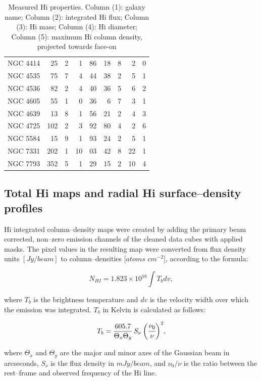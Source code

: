 \documentclass[usenatbib,useAMS]{mnras}
\begin{document}
\begin{table}
\begin{tabular}{lr@{.}lr@{.}lr@{.}lr@{.}l}
NGC 4414	&25&2         &1&86	&18&8	  	       & 2&0   \\
NGC 4535	&75&7	        &4&44	&38&2   	        & 5&1    \\
NGC 4536	&82&2	        &4&40	&36&5	        & 6&2       \\
NGC 4605	&55&1	        &0&36	&6&7     	       & 3&1    \\
NGC 4639	&13&8	        &1&56	&21&2	  	       & 4&3      \\
NGC 4725	&102&2	  &3&92	&80&4	        & 2&6          \\
NGC 5584	&15&9	        &1&93	&24&2	  	  & 5&1   \\
NGC 7331	&202&1	  &10&03	&42&8          & 22&1      \\
NGC 7793	&352&5      &1&29	&15&2            & 10&4    \\
\hline
\end{tabular} 
\caption{Measured H{\sc i} properties. 
Column (1): galaxy name;
Column (2): integrated H{\sc i} flux;
Column (3): H{\sc i} mass;
Column (4): H{\sc i} diameter;
Column (5): maximum H{\sc i} column density, projected towards face-on
}
\label{tbl_param}
\end{table}


\subsection{Total H{\sc i} maps and radial H{\sc i} surface--density profiles }

H{\sc i} integrated column--density maps were created by adding the
primary beam corrected, non--zero emission channels of the cleaned data
cubes with applied masks.  The pixel values in the resulting map were
converted from flux density units $[Jy/beam]$ to column--densities
$[atoms$ $cm^{-2}]$, according to the formula:

\begin{equation} 
N_{HI} = 1.823 \times 10^{18} \int T_{b} dv,
\end{equation}

where $T_{b}$ is the brightness temperature and $dv$ is the velocity
width over which the emission was integrated.  $T_{b}$ in Kelvin is
calculated as follows:

\begin{equation} 
T_{b} = \frac{605.7}{\Theta_{x} \Theta_{y}}  \, S_{\nu} \,  \bigg( \cfrac{\nu_{0}}{\nu} \bigg)^{2},
\end {equation}

where $\Theta_{x}$ and $\Theta_{y} $ are the major and minor axes of the
Gaussian beam in arcseconds, $S_{\nu}$ is the flux density in
$mJy/beam$, and $\nu_{0} / \nu $ is the ratio between the rest--frame
and observed frequency of the H{\sc i} line. 
\end{document}
